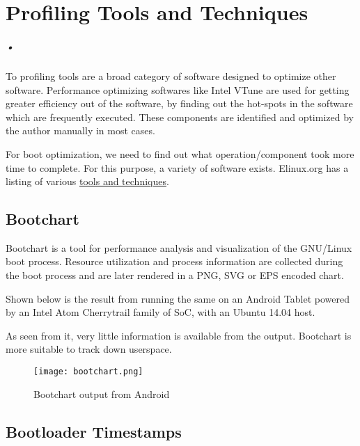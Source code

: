 

\chapter{Profiling Tools and Techniques}
\label{prof_tools_techniques}
\paragraph*{•}

\hspace{8mm} 

\noindent To profiling tools are a broad category of software designed to optimize other
software. Performance optimizing softwares like Intel VTune are used for getting
greater efficiency out of the software, by finding out the hot-spots in the
software which are frequently executed. These components are identified and
optimized by the author manually in most cases.

For boot optimization, we need to find out what operation/component took more
time to complete. For this purpose, a variety of software exists. Elinux.org
has a listing of various \href{http://elinux.org/Boot_Time}{tools and techniques}.

\section{Bootchart}

Bootchart is a tool for performance analysis and visualization of the
GNU/Linux boot process. Resource utilization and process information are collected
during the boot process and are later rendered in a PNG, SVG or EPS encoded chart.

Shown below is the result from running the same on an Android Tablet
powered by an Intel Atom Cherrytrail family of SoC, with an Ubuntu 14.04 host.

As seen from it, very little information is available from the output.
Bootchart is more suitable to track down userspace.

\begin{figure}[h]
  \centering
    \texttt{[image: bootchart.png]}
    \caption{Bootchart output from Android}
    \label{fig:android_boot}
\end{figure}

\clearpage

\section{Bootloader Timestamps}

